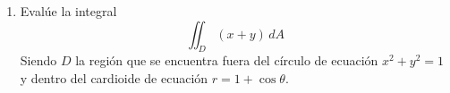 \documentclass[a4,11pt]{aleph-examen}
\begin{document}
\begin{preguntas}
\begin{respuesta}
\begin{respuesta}
\begin{respuesta}
\begin{enumerate}
 \begin{respuesta}
 \end{respuesta}

\item Evalúe la integral
	\[
        \iint_D (x+y)\,dA
    \]
    Siendo $D$ la región que se encuentra fuera del círculo de ecuación $x^2+y^2=1$ y dentro del cardioide de ecuación $r=1 + \cos \theta$.


\end{enumerate}
\end{respuesta}
\end{respuesta}
\end{respuesta}
\end{preguntas}
\end{document}
